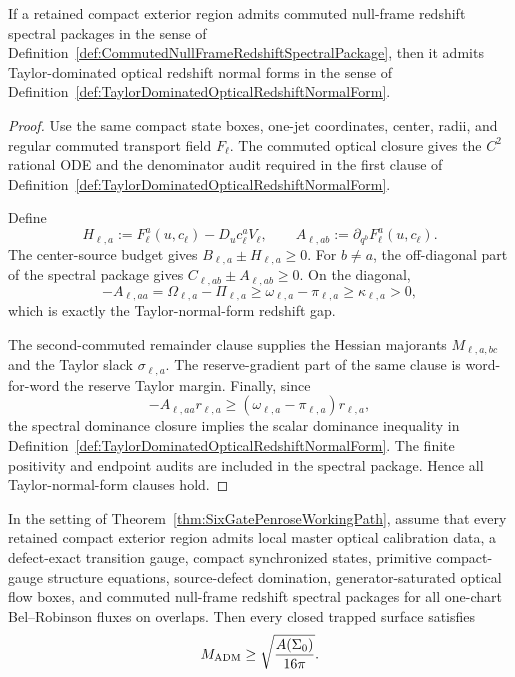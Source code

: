 \begin{theorem}\label{thm:CommutedNullFrameSpectralPackageGivesTaylorNormalForm}
If a retained compact exterior region admits commuted null-frame redshift
spectral packages in the sense of
Definition~\ref{def:CommutedNullFrameRedshiftSpectralPackage}, then it admits
Taylor-dominated optical redshift normal forms in the sense of
Definition~\ref{def:TaylorDominatedOpticalRedshiftNormalForm}.
\end{theorem}

\begin{proof}
Use the same compact state boxes, one-jet coordinates, center, radii, and
regular commuted transport field $F_\ell$.  The commuted optical closure gives
the $C^2$ rational ODE and the denominator audit required in the first clause
of Definition~\ref{def:TaylorDominatedOpticalRedshiftNormalForm}.

Define
\[
    H_{\ell,a}
    :=
    F_\ell^a(u,c_\ell)-D_uc_\ell^aV_\ell,
    \qquad
    A_{\ell,ab}
    :=
    \partial_{q^b}F_\ell^a(u,c_\ell).
\]
The center-source budget gives $B_{\ell,a}\pm H_{\ell,a}\ge0$.  For
$b\ne a$, the off-diagonal part of the spectral package gives
$C_{\ell,ab}\pm A_{\ell,ab}\ge0$.  On the diagonal,
\[
    -A_{\ell,aa}
    =
    \Omega_{\ell,a}-\Pi_{\ell,a}
    \ge
    \omega_{\ell,a}-\pi_{\ell,a}
    \ge
    \kappa_{\ell,a}>0,
\]
which is exactly the Taylor-normal-form redshift gap.

The second-commuted remainder clause supplies the Hessian majorants
$M_{\ell,a,bc}$ and the Taylor slack $\sigma_{\ell,a}$.  The reserve-gradient
part of the same clause is word-for-word the reserve Taylor margin.  Finally,
since
\[
    -A_{\ell,aa}r_{\ell,a}
    \ge
    (\omega_{\ell,a}-\pi_{\ell,a})r_{\ell,a},
\]
the spectral dominance closure implies the scalar dominance inequality in
Definition~\ref{def:TaylorDominatedOpticalRedshiftNormalForm}.  The finite
positivity and endpoint audits are included in the spectral package.  Hence all
Taylor-normal-form clauses hold.
\end{proof}

\begin{corollary}\label{cor:CommutedSpectralLocalRoutePenrose}
In the setting of Theorem~\ref{thm:SixGatePenroseWorkingPath}, assume that
every retained compact exterior region admits local master optical calibration
data, a defect-exact transition gauge, compact synchronized states, primitive
compact-gauge structure equations, source-defect domination,
generator-saturated optical flow boxes, and commuted null-frame redshift
spectral packages for all one-chart Bel--Robinson fluxes on overlaps. Then
every closed trapped surface satisfies
\[
    M_{\mathrm{ADM}}\ge \sqrt{\frac{A(\Sigma_0)}{16\pi}} .
\]
\end{corollary}

